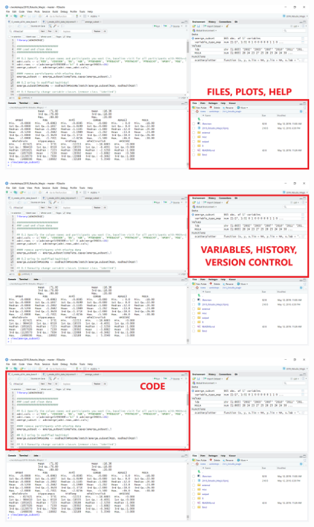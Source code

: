 \documentclass[
  ignorenonframetext,
]{beamer}
\begin{document}
\begin{frame}

\includegraphics{../external/images/rstudio_terminal_2_FILES.png}

\end{frame}

\begin{frame}

\includegraphics{../external/images/rstudio_terminal_3_ENV.png}

\end{frame}

\begin{frame}

\includegraphics{../external/images/rstudio_terminal_4_CODE.png}

\end{frame}
\end{document}
